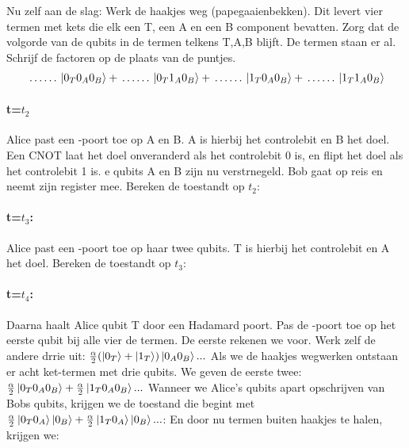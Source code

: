 \documentclass[../../main.tex]{subfiles}
\begin{document}
Nu zelf aan de slag: Werk de haakjes weg (papegaaienbekken). Dit levert vier termen met kets die elk een T, een A en een B component bevatten. Zorg dat de volgorde van de qubits in de termen telkens T,A,B blijft. De termen staan er al. Schrijf de factoren op de plaats van de puntjes.
\[\begin{aligned}
\makebox[1cm]{\dotfill} \ket{0_T0_A0_B} +\makebox[1cm]{\dotfill} \ket{0_T1_A0_B} +\makebox[1cm]{\dotfill} \ket{1_T0_A0_B} +\makebox[1cm]{\dotfill} \ket{1_T1_A0_B}
\end{aligned}\]
\paragraph{t=$t_2$} Alice past een -poort toe op A en B. A is hierbij het controlebit en B het doel. Een CNOT laat het doel onveranderd als het controlebit 0 is, en flipt het doel als het controlebit 1 is. e qubits A en B zijn nu verstrnegeld. Bob gaat op reis en neemt zijn register mee. Bereken de toestandt op $t_2$:
\notepadlines[4]
\paragraph{t=$t_3$:}Alice past een -poort toe op haar twee qubits. T is hierbij het controlebit en A het doel. Bereken de toestandt op $t_3$:
\notepadlines[4]
\paragraph{t=$t_4$:}Daarna haalt Alice qubit T door een Hadamard poort. Pas de -poort toe op het eerste qubit bij alle vier de termen. De eerste rekenen we voor. Werk zelf de andere drrie uit:
$\frac{\alpha}{2}(\ket{0_T}+\ket{1_T})\ket{0_A0_B} ...$
\clearpage %
\notepadlines[4]
Als we de haakjes wegwerken ontstaan er acht ket-termen met drie qubits. We geven de eerste twee:
$\frac{\alpha}{2}\ket{0_T0_A0_B} + \frac{\alpha}{2}\ket{1_T0_A0_B} ...$ 
\notepadlines[4]
Wanneer we Alice's qubits apart opschrijven van Bobs qubits, krijgen we de toestand die begint met $\frac{\alpha}{2}\ket{0_T0_A}\ket{0_B} +\frac{\alpha}{2}\ket{1_T0_A}\ket{0_B} ...$:
\notepadlines[4]
En door nu termen buiten haakjes te halen, krijgen we:
\end{document}
